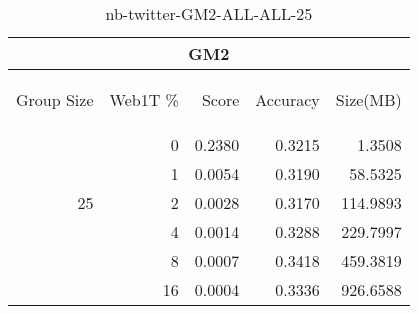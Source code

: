 \begin{center}
\begin{table}[htbp] 
 \begin{center}
\begin{tabular}{ | r | r | r | r | r |}
\hline
\multicolumn{5}{|c|}{GM2}\\
\hline
\begin{sideways}Group Size\end{sideways} & \begin{sideways}Web1T \%\end{sideways} & \begin{sideways}Score\end{sideways} & \begin{sideways}Accuracy\end{sideways} & \begin{sideways}Size(MB)\end{sideways}\\
\hline
\multirow{5}{*}{25}
 & 0 & 0.2380 & 0.3215 & 1.3508\\ \cline{2-5}
 & 1 & 0.0054 & 0.3190 & 58.5325\\ \cline{2-5}
 & 2 & 0.0028 & 0.3170 & 114.9893\\ \cline{2-5}
 & 4 & 0.0014 & 0.3288 & 229.7997\\ \cline{2-5}
 & 8 & 0.0007 & 0.3418 & 459.3819\\ \cline{2-5}
 & 16 & 0.0004 & 0.3336 & 926.6588\\ \cline{2-5}
\hline
\end{tabular}
\caption{nb-twitter-GM2-ALL-ALL-25}
\label{table:nb-twitter-GM2-ALL-ALL-25}
\end{center}
 \end{table}
\end{center}


